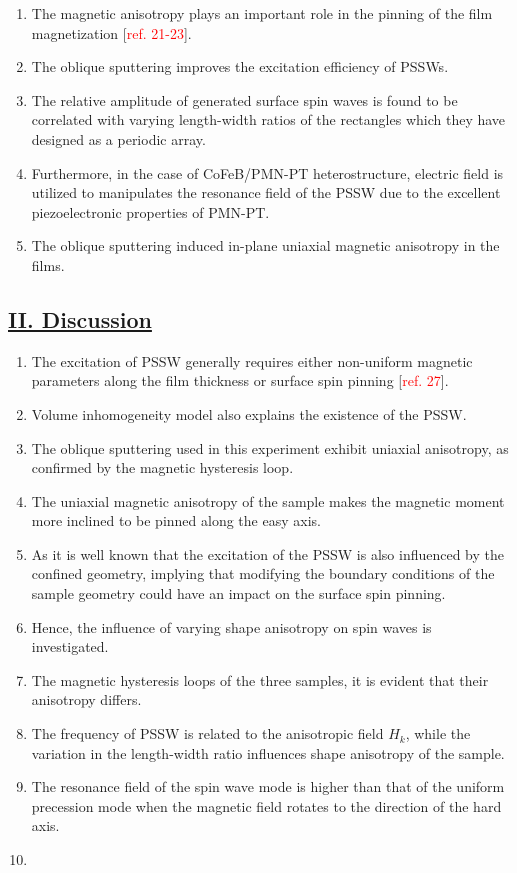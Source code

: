 \begin{enumerate}
    \item The magnetic anisotropy plays an important role in the pinning of the film magnetization [\textcolor{red}{ref. 21-23}].
    \item The oblique sputtering improves the excitation efficiency of PSSWs.
    \item The relative amplitude of generated surface spin waves is found to be correlated with varying length-width ratios of the rectangles which they have designed as a periodic array.
    \item Furthermore, in the case of CoFeB/PMN-PT heterostructure, electric field is utilized to manipulates the resonance field of the PSSW due to the excellent piezoelectronic properties of PMN-PT.
    \item The oblique sputtering induced in-plane uniaxial magnetic anisotropy in the films.
\end{enumerate}

\subsection*{\underline{II. Discussion}}
\begin{enumerate}
    \item The excitation of PSSW generally requires either non-uniform magnetic parameters along the film thickness or surface spin pinning [\textcolor{red}{ref. 27}].
    \item Volume inhomogeneity model also explains the existence of the PSSW.
    \item The oblique sputtering used in this experiment exhibit uniaxial anisotropy, as confirmed by the magnetic hysteresis loop.
    \item The uniaxial magnetic anisotropy of the sample makes the magnetic moment more inclined to be pinned along the easy axis.
    \item As it is well known that the excitation of the PSSW is also influenced by the confined geometry, implying that modifying the boundary conditions of the sample geometry could have an impact on the surface spin pinning.
    \item Hence, the influence of varying shape anisotropy on spin waves is investigated.
    \item The magnetic hysteresis loops of the three samples, it is evident that their anisotropy differs.
    \item The frequency of PSSW is related to the anisotropic field $H_k$, while the variation in the length-width ratio influences shape anisotropy of the sample.
    \item The resonance field of the spin wave mode is higher than that of the uniform precession mode when the magnetic field rotates to the direction of the hard axis.
    \item 
\end{enumerate}